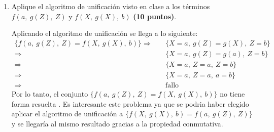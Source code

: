 \begin{enumerate}
    \item Aplique el algoritmo de unificación visto en clase a los términos $f(a,\ g(Z),\ Z)$ y $f(X,\ g(X),\ b)$ \textbf{(10 puntos)}.
    \begin{solution}
        Aplicando el algoritmo de unificación se llega a lo siguiente:
        \begin{align*}
            \{f(a,\ g(Z),\ Z) = f(X,\ g(X),\ b)\} \Rightarrow &\quad \{X = a,\ g(Z) = g(X),\ Z = b\} \\
            \Rightarrow &\quad \{X = a,\ g(Z) = g(a),\ Z = b\} \\
            \Rightarrow &\quad \{X = a,\ Z = a,\ Z = b\} \\
            \Rightarrow &\quad \{X = a,\ Z = a,\ a = b\} \\
            \Rightarrow &\quad \text{fallo}
        \end{align*}
        Por lo tanto, el conjunto $\{f(a,\ g(Z),\ Z) = f(X,\ g(X),\ b)\}$ no tiene forma resuelta \cite{guerra2022pia}. Es interesante este problema ya que se podria haber elegido aplicar el algoritmo de unificación a $\{f(X,\ g(X),\ b) = f(a,\ g(Z),\ Z)\}$ y se llegaría al mismo resultado gracias a la propiedad conmutativa.
    \end{solution}

\end{enumerate}




